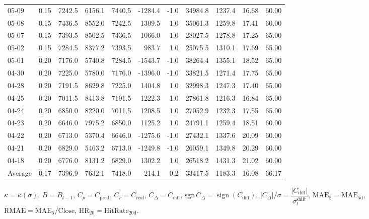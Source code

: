 \begin{threeparttable}
{\begin{tabular}{lrrrrrrrrrr}
05-09 & 0.15 & 7242.5 & 6156.1 & 7440.5 & -1284.4 & -1.0 & 34984.8 & 1237.4 & 16.68 & 60.00 \\
05-08 & 0.15 & 7436.5 & 8552.0 & 7242.5 & 1309.5 & 1.0 & 35061.3 & 1259.8 & 17.41 & 60.00 \\
05-07 & 0.15 & 7393.5 & 8502.5 & 7436.5 & 1066.0 & 1.0 & 28027.5 & 1278.8 & 17.25 & 65.00 \\
05-02 & 0.15 & 7284.5 & 8377.2 & 7393.5 & 983.7 & 1.0 & 25075.5 & 1310.1 & 17.69 & 65.00 \\
05-01 & 0.20 & 7176.0 & 5740.8 & 7284.5 & -1543.7 & -1.0 & 38264.4 & 1355.1 & 18.52 & 65.00 \\
04-30 & 0.20 & 7225.0 & 5780.0 & 7176.0 & -1396.0 & -1.0 & 33821.5 & 1271.4 & 17.75 & 65.00 \\
04-28 & 0.20 & 7191.5 & 8629.8 & 7225.0 & 1404.8 & 1.0 & 32998.3 & 1247.3 & 17.40 & 65.00 \\
04-25 & 0.20 & 7011.5 & 8413.8 & 7191.5 & 1222.3 & 1.0 & 27861.8 & 1216.3 & 16.84 & 65.00 \\
04-24 & 0.20 & 6850.0 & 8220.0 & 7011.5 & 1208.5 & 1.0 & 27052.9 & 1232.3 & 17.55 & 65.00 \\
04-23 & 0.20 & 6646.0 & 7975.2 & 6850.0 & 1125.2 & 1.0 & 24791.1 & 1259.4 & 18.51 & 60.00 \\
04-22 & 0.20 & 6713.0 & 5370.4 & 6646.0 & -1275.6 & -1.0 & 27432.1 & 1337.6 & 20.09 & 60.00 \\
04-21 & 0.20 & 6829.0 & 5463.2 & 6713.0 & -1249.8 & -1.0 & 26059.1 & 1349.8 & 20.29 & 60.00 \\
04-18 & 0.20 & 6776.0 & 8131.2 & 6829.0 & 1302.2 & 1.0 & 26518.2 & 1431.3 & 21.02 & 60.00 \\
Average & 0.17 & 7396.9 & 7632.1 & 7418.0 & 214.1 & 0.2 & 33417.5 & 1183.3 & 16.08 & 66.17 \\
\bottomrule
\end{tabular}
}%
\begin{tablenotes}\footnotesize
\item $\kappa=\kappa(\sigma)$, $B=B_{t-1}$, $C_p=C_{\text{pred}}$, $C_r=C_{\text{real}}$, $C_\Delta=C_{\text{diff}}$, $\mathrm{sgn}\,C_\Delta=\operatorname{sign}(C_{\text{diff}})$, $|C_\Delta|/\sigma=\dfrac{|C_{\text{diff}}|}{\sigma_t^{\text{shift}}}$, $\mathrm{MAE}_5=\mathrm{MAE}_{5\text{d}}$, $\mathrm{RMAE}= \mathrm{MAE}_5 / \text{Close}$, $\mathrm{HR}_{20}=\mathrm{HitRate}_{20\text{d}}$.
\end{tablenotes}
\end{threeparttable}
\endgroup